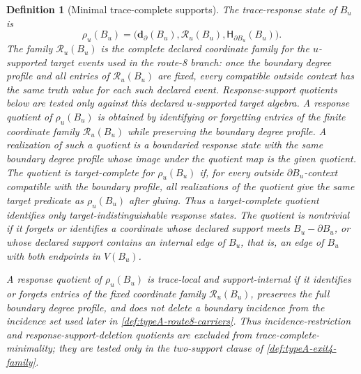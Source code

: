 \documentclass[11pt]{article}
\newtheorem{definition}[theorem]{Definition}
\newcommand{\profile}{\mathsf H}
\begin{document}
\begin{definition}[Minimal trace-complete supports]
The \emph{trace-response state} of $B_u$ is
\[
\rho_u(B_u)=
\bigl(\mathbf d_\partial(B_u),\mathcal R_u(B_u),\profile_{\partial B_u}(B_u)\bigr).
\]
The family $\mathcal R_u(B_u)$ is the complete declared coordinate family for
the $u$-supported target events used in the route-8 branch: once the boundary
degree profile and all entries of $\mathcal R_u(B_u)$ are fixed, every
compatible outside context has the same truth value for each such declared
event.  Response-support quotients below are tested only against this declared
$u$-supported target algebra.
A \emph{response quotient} of $\rho_u(B_u)$ is obtained by identifying or
forgetting entries of the finite coordinate family $\mathcal R_u(B_u)$ while
preserving the boundary degree profile.  A realization of such a quotient is a
boundaried response state with the same boundary degree profile whose image
under the quotient map is the given quotient.  The quotient is
\emph{target-complete} for $\rho_u(B_u)$ if, for every outside
$\partial B_u$-context compatible with the boundary profile, all realizations of
the quotient give the same target predicate as $\rho_u(B_u)$ after gluing.
Thus a target-complete quotient identifies only target-indistinguishable
response states.  The quotient is \emph{nontrivial} if it forgets or identifies
a coordinate whose declared support meets \(B_u-\partial B_u\), or whose
declared support contains an internal edge of \(B_u\), that is, an edge of
\(B_u\) with both endpoints in \(V(B_u)\).

A response quotient of \(\rho_u(B_u)\) is \emph{trace-local and support-internal} if
it identifies or forgets entries of the fixed coordinate family
\(\mathcal R_u(B_u)\), preserves the full boundary degree profile, and does not
delete a boundary incidence from the incidence set used later in
\cref{def:typeA-route8-carriers}.  Thus incidence-restriction and
response-support-deletion quotients are excluded from trace-complete-minimality; they
are tested only in the two-support clause of
\cref{def:typeA-exit4-family}.


\end{definition}
\end{document}

